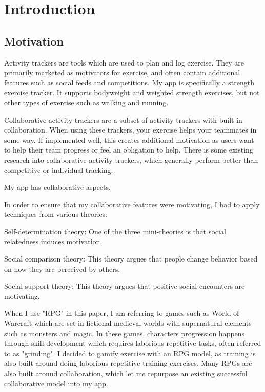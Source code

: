 \documentclass{l4proj}
\begin{document}
\chapter{Introduction}

\section{Motivation}

Activity trackers are tools which are used to plan and log exercise. They are primarily marketed as motivators for exercise, and often contain additional features such as social feeds and competitions. My app is specifically a strength exercise tracker. It supports bodyweight and weighted strength exercises, but not other types of exercise such as walking and running. 

Collaborative activity trackers are a subset of activity trackers with built-in collaboration. When using these trackers, your exercise helps your teammates in some way. If implemented well, this creates additional motivation as users want to help their team progress or feel an obligation to help. There is some existing research into collaborative activity trackers, which generally perform better than competitive or individual tracking.

My app has collaborative aspects,

In order to ensure that my collaborative features were motivating, I had to apply techniques from various theories:

Self-determination theory: One of the three mini-theories is that social relatedness induces motivation. 

Social comparison theory: This theory argues that people change behavior based on how they are perceived by others. 

Social support theory: This theory argues that positive social encounters are motivating.

When I use "RPG" in this paper, I am referring to games such as World of Warcraft which are set in fictional medieval worlds with supernatural elements such as monsters and magic. In these games, characters progression happens through skill development which requires laborious repetitive tasks, often referred to as "grinding". I decided to gamify exercise with an RPG model, as training is also built around doing laborious repetitive training exercises. Many RPGs are also built around collaboration, which let me repurpose an existing successful collaborative model into my app. 
\end{document}
